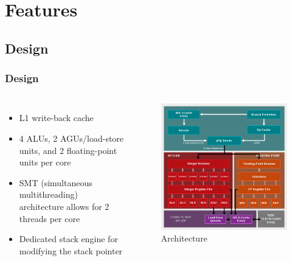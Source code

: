 \documentclass{beamer}
\begin{document}
	\section{Features}
	\subsection{Design}	
	\begin{frame}
		\frametitle{Design}
		\begin{columns}[c] 			
			\begin{itemize}
				\item L1 write-back cache
				\item 4 ALUs, 2 AGUs/load-store units, and 2 floating-point units per core
				\item SMT (simultaneous multithreading) architecture allows for 2 threads per core
				\item Dedicated stack engine for modifying the stack pointer
			\end{itemize}			
			\begin{figure}[p]
				\includegraphics[width=\textwidth]{architecture.png}
				\caption{Architecture}
			\end{figure}			
		\end{columns}
	\end{frame}	
\end{document}
